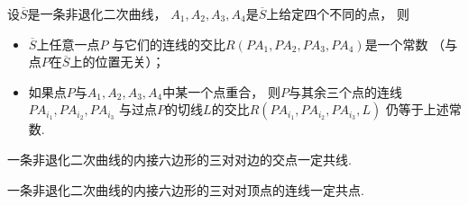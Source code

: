 \begin{theorem}
设\(\overline{S}\)是一条非退化二次曲线，
\(A_1,A_2,A_3,A_4\)是\(\overline{S}\)上给定四个不同的点，
则\begin{itemize}
	\item \(\overline{S}\)上任意一点\(P\)
	与它们的连线的交比\(R(PA_1,PA_2,PA_3,PA_4)\)是一个常数
	（与点\(P\)在\(\overline{S}\)上的位置无关）；

	\item 如果点\(P\)与\(A_1,A_2,A_3,A_4\)中某一个点重合，
	则\(P\)与其余三个点的连线\(PA_{i_1},PA_{i_2},PA_{i_3}\)
	与过点\(P\)的切线\(L\)的交比\(R(PA_{i_1},PA_{i_2},PA_{i_3},L)\)
	仍等于上述常数.
\end{itemize}
\end{theorem}

\begin{theorem}
一条非退化二次曲线的内接六边形的三对对边的交点一定共线.
\end{theorem}

\begin{theorem}
一条非退化二次曲线的内接六边形的三对对顶点的连线一定共点.
\end{theorem}
